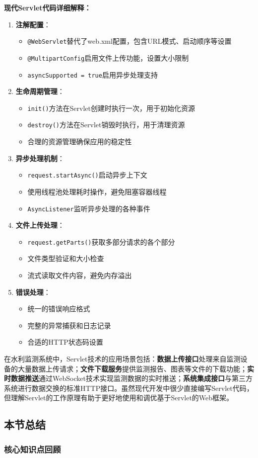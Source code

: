 \textbf{现代Servlet代码详细解释：} \begin{enumerate} \def\labelenumi{\arabic{enumi}.} \item \textbf{注解配置}： \begin{itemize} \item \texttt{@WebServlet}替代了web.xml配置，包含URL模式、启动顺序等设置 \item \texttt{@MultipartConfig}启用文件上传功能，设置大小限制 \item \texttt{asyncSupported\ =\ true}启用异步处理支持 \end{itemize} \item \textbf{生命周期管理}： \begin{itemize} \item \texttt{init()}方法在Servlet创建时执行一次，用于初始化资源 \item \texttt{destroy()}方法在Servlet销毁时执行，用于清理资源 \item 合理的资源管理确保应用的稳定性 \end{itemize} \item \textbf{异步处理机制}： \begin{itemize} \item \texttt{request.startAsync()}启动异步上下文 \item 使用线程池处理耗时操作，避免阻塞容器线程 \item \texttt{AsyncListener}监听异步处理的各种事件 \end{itemize} \item \textbf{文件上传处理}： \begin{itemize} \item \texttt{request.getParts()}获取多部分请求的各个部分 \item 文件类型验证和大小检查 \item 流式读取文件内容，避免内存溢出 \end{itemize} \item \textbf{错误处理}： \begin{itemize} \item 统一的错误响应格式 \item 完整的异常捕获和日志记录 \item 合适的HTTP状态码设置 \end{itemize} \end{enumerate} 在水利监测系统中，Servlet技术的应用场景包括：\textbf{数据上传接口}处理来自监测设备的大量数据上传请求；\textbf{文件下载服务}提供监测报告、图表等文件的下载功能；\textbf{实时数据推送}通过WebSocket技术实现监测数据的实时推送；\textbf{系统集成接口}与第三方系统进行数据交换的标准HTTP接口。虽然现代开发中很少直接编写Servlet代码，但理解Servlet的工作原理有助于更好地使用和调优基于Servlet的Web框架。 \subsection{本节总结}\label{ux672cux8282ux603bux7ed3} \subsubsection{核心知识点回顾}\label{ux6838ux5fc3ux77e5ux8bc6ux70b9ux56deux987e} 